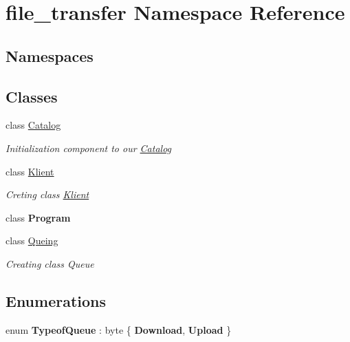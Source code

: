 \hypertarget{namespacefile__transfer}{}\section{file\+\_\+transfer Namespace Reference}
\label{namespacefile__transfer}
\subsection*{Namespaces}
\begin{DoxyCompactItemize}
\end{DoxyCompactItemize}
\subsection*{Classes}
\begin{DoxyCompactItemize}
\item 
class \hyperlink{classfile__transfer_1_1_catalog}{Catalog}
\begin{DoxyCompactList}\small\item\em Initialization component to our \hyperlink{classfile__transfer_1_1_catalog}{Catalog} \end{DoxyCompactList}\item 
class \hyperlink{classfile__transfer_1_1_klient}{Klient}
\begin{DoxyCompactList}\small\item\em Creting class \hyperlink{classfile__transfer_1_1_klient}{Klient} \end{DoxyCompactList}\item 
class {\bfseries Program}
\item 
class \hyperlink{classfile__transfer_1_1_queing}{Queing}
\begin{DoxyCompactList}\small\item\em Creating class Queue \end{DoxyCompactList}\end{DoxyCompactItemize}
\subsection*{Enumerations}
\begin{DoxyCompactItemize}
\item 
\mbox{\label{namespacefile__transfer_a074756ba4c8a580523cd37eaa8d2ea8f}} 
enum {\bfseries Typeof\+Queue} \+: byte \{ {\bfseries Download}, 
{\bfseries Upload}
 \}
\end{DoxyCompactItemize}
